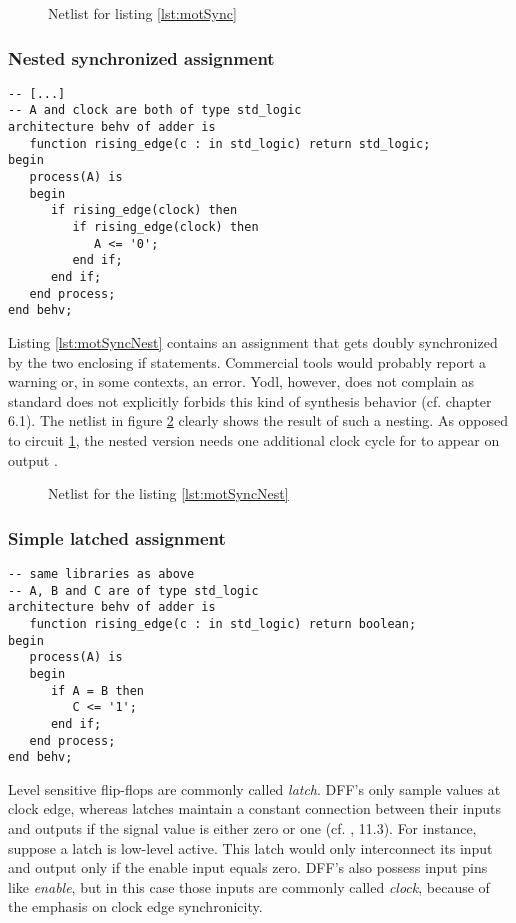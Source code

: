\begin{figure}[p]
    \centering
    \caption{Netlist for listing \ref{lst:motSync}}
    
    \label{fig:netlistMotSync}
\end{figure}

\subsubsection{Nested synchronized assignment}
\leavevmode\begin{lstlisting}[style=vhdl, caption={Code for a nested synchronized
      bit assignment}, label={lst:motSyncNest}]
-- [...]
-- A and clock are both of type std_logic
architecture behv of adder is
   function rising_edge(c : in std_logic) return std_logic;
begin
   process(A) is
   begin
      if rising_edge(clock) then
         if rising_edge(clock) then
            A <= '0';
         end if;
      end if;
   end process;
end behv;
\end{lstlisting}
%
Listing \ref{lst:motSyncNest} contains an assignment that gets
doubly synchronized by the two enclosing if statements. Commercial
tools would probably report a warning or, in some contexts, an
error. Yodl, however, does not complain as standard \cite{IEEESYNTH}
does not explicitly forbids this kind of synthesis behavior
(cf. chapter 6.1). The
netlist in figure \ref{fig:netlistMotSyncNest} clearly shows the
result of such a nesting. As opposed to circuit
\ref{fig:netlistMotSync}, the nested version needs one additional
clock cycle for  to appear on output .

\begin{figure}[p]
    \centering
    \caption{Netlist for the listing \ref{lst:motSyncNest}}
    
    \label{fig:netlistMotSyncNest}
\end{figure}

\subsubsection{Simple latched assignment}
\label{sec:SimpleLatchedAssign}
\leavevmode\begin{lstlisting}[style=vhdl, caption={Code for a simple latched bit
      assignment}, label={lst:motLatch}]
-- same libraries as above
-- A, B and C are of type std_logic
architecture behv of adder is
   function rising_edge(c : in std_logic) return boolean;
begin
   process(A) is
   begin
      if A = B then
         C <= '1';
      end if;
   end process;
end behv;
\end{lstlisting}
%
Level sensitive flip-flops are commonly called \emph{latch}. DFF's
only sample values at clock edge, whereas latches maintain a constant
connection between their inputs and outputs if the signal value is
either zero or one (cf. \cite{DIGITALTECHNIK}, 11.3). For instance,
suppose a latch is low-level
active. This latch would only interconnect its input and output only
if the enable input equals zero. DFF's also possess input pins like
\emph{enable}, but in this case those inputs are commonly called
\emph{clock}, because of the emphasis on clock edge synchronicity.


